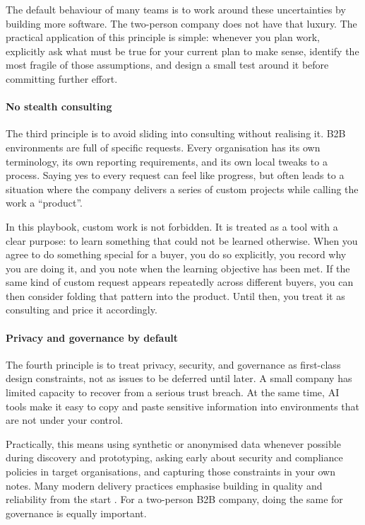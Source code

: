 \documentclass[10pt, a4paper, twocolumn]{article} %
\begin{document}
The default behaviour of many teams is to work around these uncertainties by building more software. The two-person company does not have that luxury. The practical application of this principle is simple: whenever you plan work, explicitly ask what must be true for your current plan to make sense, identify the most fragile of those assumptions, and design a small test around it before committing further effort.

\paragraph{No stealth consulting}

The third principle is to avoid sliding into consulting without realising it. B2B environments are full of specific requests. Every organisation has its own terminology, its own reporting requirements, and its own local tweaks to a process. Saying yes to every request can feel like progress, but often leads to a situation where the company delivers a series of custom projects while calling the work a “product”.

In this playbook, custom work is not forbidden. It is treated as a tool with a clear purpose: to learn something that could not be learned otherwise. When you agree to do something special for a buyer, you do so explicitly, you record why you are doing it, and you note when the learning objective has been met. If the same kind of custom request appears repeatedly across different buyers, you can then consider folding that pattern into the product. Until then, you treat it as consulting and price it accordingly.

\paragraph{Privacy and governance by default}

The fourth principle is to treat privacy, security, and governance as first-class design constraints, not as issues to be deferred until later. A small company has limited capacity to recover from a serious trust breach. At the same time, AI tools make it easy to copy and paste sensitive information into environments that are not under your control.

Practically, this means using synthetic or anonymised data whenever possible during discovery and prototyping, asking early about security and compliance policies in target organisations, and capturing those constraints in your own notes. Many modern delivery practices emphasise building in quality and reliability from the start \citep{forsgren2018accelerate}. For a two-person B2B company, doing the same for governance is equally important.
\end{document}
